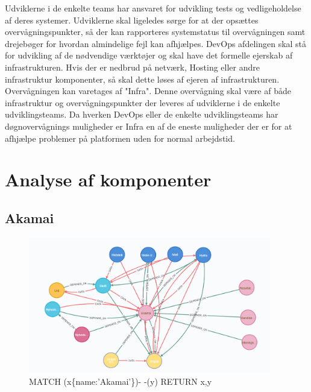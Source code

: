 \documentclass{article}
\begin{document}
Udviklerne i de enkelte teams har ansvaret for udvikling tests og vedligeholdelse af deres systemer. Udviklerne skal ligeledes sørge for at der opsættes overvågningspunkter, så der kan rapporteres systemstatus til overvågningen samt drejebøger for hvordan almindelige fejl kan afhjælpes.
DevOps afdelingen skal stå for udvikling af de nødvendige værktøjer og skal have det formelle ejerskab af infrastrukturen. Hvis der er nedbrud på netværk, Hosting eller andre infrastruktur komponenter, så skal dette løses af ejeren af infrastrukturen.
Overvågningen kan varetages af "Infra". Denne overvågning skal være af både infrastruktur og overvågningspunkter der leveres af udviklerne i de enkelte udviklingsteams. Da hverken DevOps eller de enkelte udviklingsteams har døgnovervågnings muligheder er Infra en af de eneste muligheder der er for at afhjælpe problemer på platformen uden for normal arbejdstid.




\section{Analyse af komponenter}

\subsection{Akamai}
\begin{figure}[h]
\includegraphics[width=300pt]{Akamai.PNG}
\caption{MATCH (x\{name:'Akamai'\})- -(y) RETURN x,y}
\end{figure}
\end{document}
